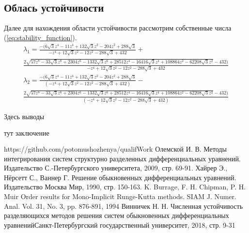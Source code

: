 \documentclass[a4paper,article,14pt]{extarticle}
\begin{document}
\subsection{Облась устойчивости}
Далее для нахождения области устойчивости рассмотрим собственные числа (\ref{eq:stability_function}).
{\footnotesize
\begin{multline}
    \lambda_{1} = \frac{-(6 \sqrt{3} z^{4} - 11 z^{4} + 132 \sqrt{3} z^{2} - 204 z^{2} + 288 \sqrt{3}}{-z^{4} + 12 \sqrt{3} z^{2} - 12 z^{2} - 288 \sqrt{3} + 432} + \\ \frac{2 \sqrt{57 z^8 - 33 \sqrt{3} z^8 + 2304 z^{6} - 1332 \sqrt{3} z^{6} + 28512 z^{4} - 16416  \sqrt{3} z^{4} + 108864 z^{2} - 62208 \sqrt{3} z^{2}} - 432)}{-z^{4} + 12 \sqrt{3} z^{2} - 12 z^{2} - 288 \sqrt{3} + 432} \\
    \lambda_{2} = \frac{-(6 \sqrt{3} z^{4} - 11 z^{4} + 132 \sqrt{3} z^{2} - 204 z^{2} + 288 \sqrt{3}}{(-z^{4} + 12 \sqrt{3} z^{2} - 12 z^{2} - 288 \sqrt{3} + 432)} - \\ \frac{2 \sqrt{57 z^{8} - 33 \sqrt{3} z^{8} + 2304 z^{6} - 1332 \sqrt{3} z^{6} + 28512 z^{4} - 16416 \sqrt{3} z^{4} + 108864 z^{2} - 62208 \sqrt{3} z^{2}} - 432)}{(-z^{4} + 12 \sqrt{3} z^{2} - 12 z^{2} - 288 \sqrt{3} + 432)}
\end{multline}}
\pagebreak

Здесь выводы
\pagebreak

тут заключение
\pagebreak

\begin{thebibliography}{1}
 https://github.com/potomushozhenya/qualifWork
 Олемской И. В. \flqq Методы интегрирования систем структурно разделенных дифференциальных уравнений\frqq. Издательство С.-Петербургского университета, 2009, стр. 69-91.
 Хайрер Э., Нёрсетт С., Ваннер Г. \flqq Решение обыкновенных дифференциальных уравнений\frqq. Издательство Москва Мир, 1990, стр. 150-163.
 K. Burrage, F. H. Chipman, P. H. Muir \flqq Order results for Mono-Implicit Runge-Kutta methods\frqq.  SIAM J. Numer. Anal. Vol. 31, No. 3, pp. 876-891, 1994
 Винничек Н. Н. \flqq Численная устойчивость разделяющихся методов решения систем обыкновенных дифференциальных уравнений\frqq  Санкт-Петербургский государственный университет, 2018, стр. 9-31
\end{thebibliography}
\pagebreak

\end{document}
